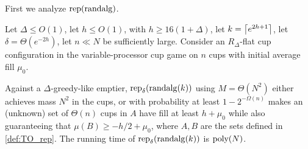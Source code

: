 First we analyze $\operatorname{\text{\textup{rep}}}(\operatorname{\text{\textup{randalg}}})$.
\begin{lemma}
  \label{lem:TO_obliviousManyUnknownCups}
  Let $\Delta \le O(1)$, let $h\le O(1)$, with $h \ge
  16(1+\Delta)$, let $k=\left\lceil e^{2h+1} \right\rceil$, let $\delta =
  \Theta(e^{-2h})$, let $n\ll N$ be sufficiently large. 
  Consider an $R_\Delta$-flat cup configuration in the
  variable-processor cup game on $n$ cups with initial average
  fill $\mu_0$.

  Against a $\Delta$-greedy-like emptier,
  $\operatorname{\text{\textup{rep}}}_{\delta}(\operatorname{\text{\textup{randalg}}}(k))$ using $M = \Theta(N^2)$
  either achieves mass $N^2$ in the cups, or with probability at
  least $1-2^{-\Omega(n)}$ makes an (unknown) set of $\Theta(n)$
  cups in $A$ have fill at least $h+\mu_0$ while also
  guaranteeing that $\mu(B) \ge -h/2 + \mu_0$, where $A,B$ are
  the sets defined in \cref{def:TO_rep}. The running time of
  $\operatorname{\text{\textup{rep}}}_{\delta}(\operatorname{\text{\textup{randalg}}}(k))$ is $\operatorname{\text{poly}}(N)$.
\end{lemma}
